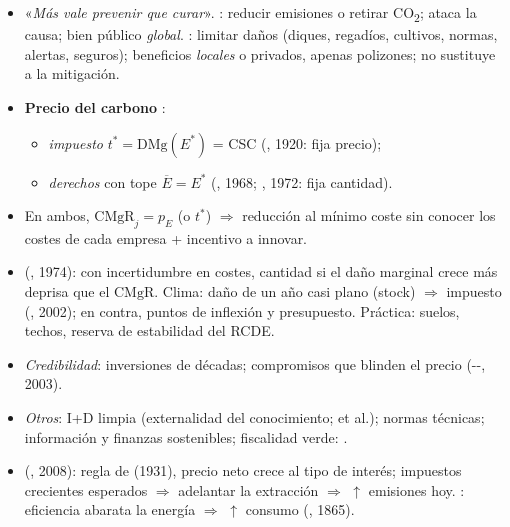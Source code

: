\documentclass{article}
\begin{document}
\begin{columnas}
\begin{itemize}
\item «\emph{Más vale prevenir que curar}». : reducir emisiones o retirar CO\textsubscript{2}; ataca la causa; bien público \emph{global}. : limitar daños (diques, regadíos, cultivos, normas, alertas, seguros); beneficios \emph{locales} o privados, apenas polizones; no sustituye a la mitigación.
\item \textbf{Precio del carbono} :
  \begin{itemize}
  \item \emph{impuesto} $t^*=\mathrm{DMg}(E^*)$ = CSC (, 1920: fija precio);
  \item \emph{derechos} con tope $\overline{E}=E^*$ (, 1968; , 1972: fija cantidad).
  \end{itemize}
\item En ambos, $\mathrm{CMgR}_j=p_E$ (o $t^*$) $\Rightarrow$ reducción al mínimo coste sin conocer los costes de cada empresa + incentivo a innovar.
\item {} (, 1974): con incertidumbre en costes, cantidad si el daño marginal crece más deprisa que el $\mathrm{CMgR}$. Clima: daño de un año casi plano (stock) $\Rightarrow$ impuesto (, 2002); en contra, puntos de inflexión y presupuesto. Práctica: suelos, techos, reserva de estabilidad del RCDE.
\item \emph{Credibilidad}: inversiones de décadas; compromisos que blinden el precio (--, 2003).
\item \emph{Otros}: I+D limpia (externalidad del conocimiento;  et al.); normas técnicas; información y finanzas sostenibles; fiscalidad verde:  .
\item {} (, 2008): regla de  (1931), precio neto crece al tipo de interés; impuestos crecientes esperados $\Rightarrow$ adelantar la extracción $\Rightarrow$ $\uparrow$ emisiones hoy. : eficiencia abarata la energía $\Rightarrow$ $\uparrow$ consumo (, 1865).
\end{itemize}


\end{columnas}
\end{document}
